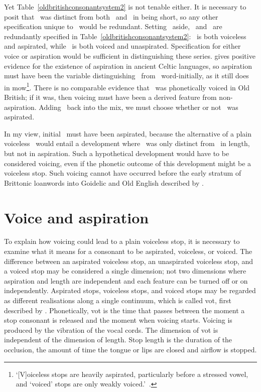 Yet Table~\ref{oldbritishconsonantsystem2} is not tenable either. It is necessary to posit that \lT\ was distinct from both \xT\ and \xD\ in being short, so any other specification unique to \lT\ would be redundant. Setting \lT\ aside, \xT\ and \xD\ are redundantly specified in Table~\ref{oldbritishconsonantsystem2}: \xT\ is both voiceless and aspirated, while \xD\ is both voiced and unaspirated. Specification for either voice or aspiration would be sufficient in distinguishing these series. \Textcite{koch_*cothairche_1990} gives positive evidence for the existence of aspiration in ancient Celtic languages, so aspiration must have been the variable distinguishing \xT\ from \xD\ word-initially, as it still does in \gls{mow}\footnote{`[V]oiceless stops are heavily aspirated,
particularly before a stressed vowel, and ‘voiced’ stops are only weakly voiced.'~\autocite[368]{Awb_Welsh09}.}. There is no comparable evidence that \xD\ was phonetically voiced in Old British; if it was, then voicing must have been a derived feature from non-aspiration. Adding \lT\ back into the mix, we must choose whether or not \lT\ was aspirated.

In my view, initial \lT\ must have been aspirated, because the alternative of a plain voiceless \lT\ would entail a development where \lT\ was only distinct from \xD\ in length, but not in aspiration. Such a hypothetical development would have to be considered voicing, even if the phonetic outcome of this development might be a voiceless stop. Such voicing cannot have occurred before the early stratum of Brittonic loanwords into Goidelic and Old English described by \textcite{koch_*cothairche_1990}.

\section{Voice and aspiration}
\label{sec:voice-aspiration}
To explain how voicing could lead to a plain voiceless stop, it is necessary to examine what it means for a consonant to be aspirated, voiceless, or voiced. The difference between an aspirated voiceless stop, an unaspirated voiceless stop, and a voiced stop may be considered a single dimension; not two dimensions where aspiration and length are independent and each feature can be turned off or on independently. Aspirated stops, voiceless stops, and voiced stops may be regarded as different realisations along a  single continuum, which is called \acrfull{vot}, first described by \textcite{LA_CrossLanguage64}. Phonetically, \gls{vot} is the time that passes between the moment a stop consonant is released and the moment when voicing starts. Voicing is produced by the vibration of the vocal cords. The dimension of \gls{vot} is independent of the dimension of length. Stop length is the duration of the occlusion, \ie the amount of time the tongue or lips are closed and airflow is stopped. 

